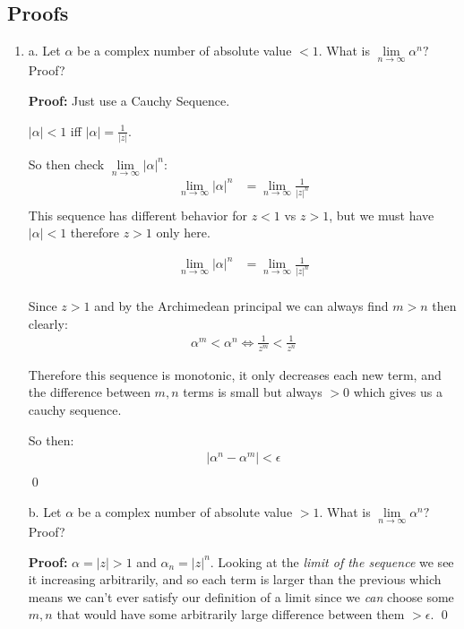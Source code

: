 \subsection{Proofs}
\begin{enumerate}
	\item 
	\subitem a. Let $\alpha$ be a complex number of absolute value $< 1.$ 
	What is $\lim\limits_{n \to \infty} \alpha^n ?$ Proof?

	\textbf{Proof:}
	Just use a Cauchy Sequence.

	$|\alpha| < 1$ iff $ |\alpha| = \frac{1}{|z|}.$ 

	So then check $\lim\limits_{n \to \infty} |\alpha|^n$:
	\begin{align*}
		\lim\limits_{n \to \infty} |\alpha|^n &= \lim\limits_{n \to \infty} \frac{1}{|z|^n} \\
	\end{align*}
	This sequence has different behavior for $z < 1$ vs $z > 1$, but we must have $|\alpha| < 1$ therefore $z > 1$ only here.

	\begin{align*}
		\lim\limits_{n \to \infty} |\alpha|^n &= \lim\limits_{n \to \infty} \frac{1}{|z|^n} \\
	\end{align*}

	Since $z > 1$ and by the Archimedean principal we can always find $m > n$
	then clearly: 
	\begin{align*}
	\alpha^m < \alpha^n \iff \frac{1}{z^m} < \frac{1}{z^n}
	\end{align*}
	
	Therefore this sequence is monotonic, it only decreases each new term, and the difference between $m, n$ terms is 
	small but always $> 0$ which gives us a cauchy sequence.

	So then:
	\begin{align*}
		|\alpha^n - \alpha^m| < \epsilon \\
	\end{align*} \qed

	\subitem b. Let $\alpha$ be a complex number of absolute value $> 1.$ 
	What is $\lim\limits_{n \to \infty} \alpha^n ?$ Proof?

	\textbf{Proof:}
	$ \alpha = |z| > 1$ and $\alpha_n = |z|^n.$ 
	Looking at the \textit{limit of the sequence} we see it increasing arbitrarily, and so each 
	term is larger than the previous which means we can't ever satisfy our definition of a limit 
	since we \textit{can} choose some $m, n$ that would have some arbitrarily large difference between 
	them $> \epsilon.$ \qed
	

\end{enumerate}
